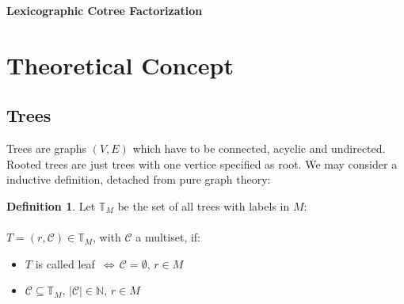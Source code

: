\documentclass[a4paper,12pt]{article}
\theoremstyle{definition}
\newtheorem{definition}{Definition}[section]
\newcommand{\Uebungsblatt}{Lexicographic Cotree Factorization}
\begin{document}
	\thispagestyle{fancy}
	\pagestyle{fancy}
	\begin{center}
		\LARGE \sf \textbf{ \Uebungsblatt{}}
	\end{center}
	\vspace*{0.1cm}
	\tableofcontents
	\newpage
	\thispagestyle{fancy}
	\section{Theoretical Concept}
	\subsection{Trees}
		Trees are graphs $(V,E)$ which have to be connected, acyclic and undirected. Rooted trees are just trees with one vertice specified as root.
		We may consider a inductive definition, detached from pure graph theory:\\
		\begin{definition}
			Let $\mathds{T}_M$ be the set of all trees with labels in $M$:\\\\
			$T=(r,\mathcal{C}) \in \mathds{T}_M$, with $\mathcal{C}$  a multiset, if:
			\begin{itemize}
				\item $T$ is called leaf $\,\Longleftrightarrow\,\mathcal{C}=\emptyset,\, r\in M$
				\item $\mathcal{C}\subseteq \mathds{T}_M,\,|\mathcal{C}|\in\mathds{N},\, r\in M$\\
			\end{itemize}
		\end{definition}
\end{document}
